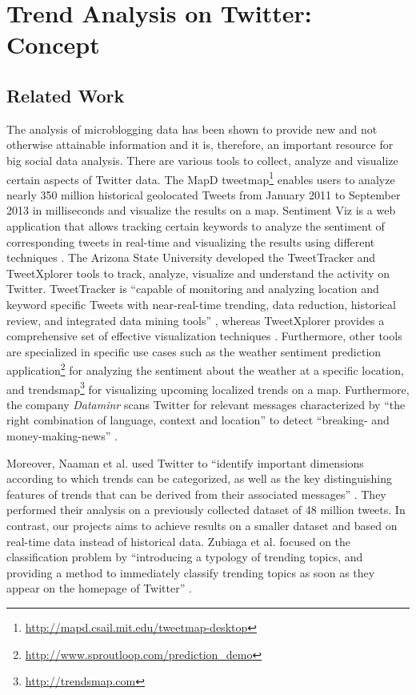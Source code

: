 
\chapter{Trend Analysis on Twitter: Concept}
\label{cha:trend-detection-concept}

\section{Related Work}
\label{sec:related-work}
The analysis of microblogging data has been shown to provide new and not otherwise attainable information and it is, therefore, an important resource for big social data analysis. There are various tools to collect, analyze and visualize certain aspects of Twitter data. The MapD tweetmap\footnote{\url{http://mapd.csail.mit.edu/tweetmap-desktop} \accessednote} enables users to analyze nearly 350 million historical geolocated Tweets from January 2011 to September 2013 in milliseconds and visualize the results on a map. Sentiment Viz is a web application that allows tracking certain keywords to analyze the sentiment of corresponding tweets in real-time and visualizing the results using different techniques \cite{healy2014twittersentiment}. The Arizona State University developed the TweetTracker and TweetXplorer tools to track, analyze, visualize and understand the activity on Twitter. TweetTracker is \enquote{capable of monitoring and analyzing location and keyword specific Tweets with near-real-time trending, data reduction, historical review, and integrated data mining tools} \cite[1]{kumar2011tweettracker}, whereas TweetXplorer provides a comprehensive set of effective visualization techniques \cite{morstatter2013understanding}. Furthermore, other tools are specialized in specific use cases such as the weather sentiment prediction application\footnote{\url{http://www.sproutloop.com/prediction_demo} \accessednote} for analyzing the sentiment about the weather at a specific location, and trendsmap\footnote{\url{http://trendsmap.com} \accessednote} for visualizing upcoming localized trends on a map. Furthermore, the company \textit{Dataminr} scans Twitter for relevant messages characterized by \enquote{the right combination of language, context and location} to detect \enquote{breaking- and money-making-news} \cite{alcorn2013stockmarket}.

Moreover, Naaman et al. used Twitter to \enquote{identify important dimensions according to which trends can be categorized, as well as the key distinguishing features of trends that can be derived from their associated messages} \cite{naaman2011characterizing}. They performed their analysis on a previously collected dataset of 48 million tweets. In contrast, our projects aims to achieve results on a smaller dataset and based on real-time data instead of historical data. Zubiaga et al. focused on the classification problem by \enquote{introducing a typology of trending topics, and providing a method to immediately classify trending topics as soon as they appear on the homepage of Twitter} \cite{zubiaga2011classifications}.


